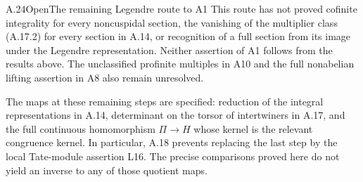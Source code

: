 \begin{statement}{A.24}{Open}{The remaining Legendre route to A1}
This route has not proved cofinite integrality for every noncuspidal
section, the vanishing of the multiplier class (A.17.2) for every
section in A.14, or recognition of a full section from its image under
the Legendre representation.  Neither assertion of A1 follows from
the results above.  The unclassified profinite multiples in A10 and
the full nonabelian lifting assertion in A8 also remain unresolved.
\end{statement}
The maps at these remaining steps are specified: reduction of the
integral representations in A.14, determinant on the torsor of
intertwiners in A.17, and the full continuous homomorphism
$\Pi\to H$ whose kernel is the relevant congruence kernel.  In
particular, A.18 prevents replacing the last step by the local
Tate-module assertion L16.  The precise comparisons proved here do
not yield an inverse to any of those quotient maps.
